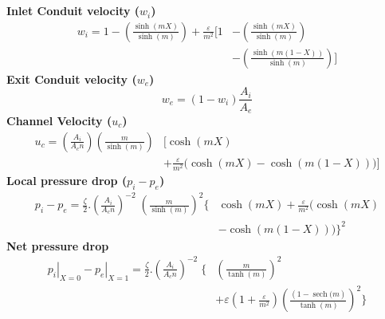 \documentclass[10pt,a4paper]{article}
\begin{document}
%
%
\section{ }
\textbf{Inlet Conduit velocity ($w_i$)}
\begin{equation}\label{wi} 	
\begin{split}
{w}_{i}=1-\left( \frac{\sinh (mX)}{\sinh (m)} \right)+\frac{\varepsilon }{{m}^{2}}\Biggl[ 1 & - \left( \frac{\sinh (mX)}{\sinh (m)} \right) \\
& -\left( \frac{\sinh (m(1-X))}{\sinh (m)} \right) \Biggr]
\end{split}
\end{equation}
%
%
\textbf{Exit Conduit velocity ($w_e$)}
\begin{equation}\label{we}
{w}_{e}=\left( 1-{w}_{i} \right)\frac{{A}_{i}}{{A}_{e}}
\end{equation}
%
%
\textbf{Channel Velocity ($u_c$)}
\begin{equation} \label{uc} 
\begin{split}
{{u}_{c}}=\left(\frac{{A}_{i}}{{{A}_{c}}n} \right) \left( \frac{m}{\sinh (m)} \right) &  \Biggl[ \cosh (mX)  \\ 
 & + \frac{\varepsilon }{{m}^{2}}\biggl( \cosh (mX)-\cosh (m(1-X)) \biggr) \Biggr]
\end{split}
\end{equation}
%
%
\textbf{Local pressure drop ($p_i-p_e$)}
\begin{equation} \label{dp} 
\begin{split}
{{p}_{i}}-{{p}_{e}}={\frac{\zeta}{2}}.\left( \frac{{A}_{i}}{{{A}_{c}}n} \right)^{-2}\; {\left( \frac{m}{\sinh (m)} \right)}^{2}\Biggl\{ & \cosh (mX)
+\frac{\varepsilon }{{{m}^{2}}}\biggl( \cosh (mX)\\
& - \cosh (m(1-X)) \biggr) \Biggr\}^{2}
\end{split}
\end{equation}
%
%
\textbf{Net pressure drop}
\begin{equation} \label{netdp} 
\begin{split}
{{\left. {{p}_{i}} \right|}_{X=0}}-{{\left. {{p}_{e}} \right|}_{X=1}}={\frac{\zeta}{2}}.{{{\left( \frac{{{A}_{i}}}{{{A}_{c}}n} \right)}^{-2}}}\; \Biggl\{ & {{\left( \frac{m}{\tanh (m)} \right)}^{2}} \\
& +\varepsilon \left( 1+\frac{\varepsilon }{{{m}^{2}}} \right){{\left( \frac{\left( 1-\operatorname{sech}(m \right)}{\tanh (m)} \right)}^{2}} \Biggr\}  
\end{split}
\end{equation} 
%
\end{document}
